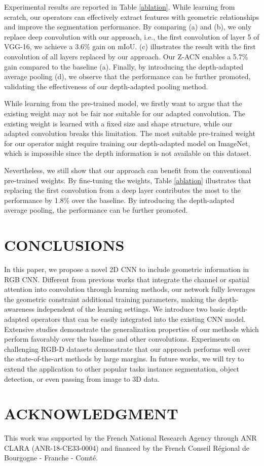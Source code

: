 \documentclass[lettersize,journal]{IEEEtran}
\begin{document}
Experimental results are reported in Table \ref{ablation}. While learning from scratch, our operators can effectively extract features with geometric relationships and improve the segmentation performance. By comparing (a) and (b), we only replace deep convolution with our approach, i.e., the first convolution of layer 5 of VGG-16, we achieve a 3.6\% gain on mIoU.  (c) illustrates the result with the first convolution of all layers replaced by our approach.  Our Z-ACN enables a 5.7\% gain compared to the baseline (a). Finally, by introducing the depth-adapted average pooling (d), we observe that the performance can be further promoted, validating the effectiveness of our depth-adapted pooling method.

While learning from the pre-trained model, we firstly want to argue that the existing weight may not be fair nor suitable for our adapted convolution. The existing weight is learned with a fixed size and shape structure, while our adapted convolution breaks this limitation. The most suitable pre-trained weight for our operator might require training our depth-adapted model on ImageNet, which is impossible since the depth information is not available on this dataset.

Nevertheless, we still show that our approach can benefit from the conventional pre-trained weights. By fine-tuning the weights, Table \ref{ablation} illustrates that replacing the first convolution from a deep layer contributes the most to the performance by 1.8\% over the baseline. By introducing the depth-adapted average pooling, the performance can be further promoted.


\section{CONCLUSIONS}

In this paper, we propose a novel 2D CNN to include geometric information in RGB CNN. Different from previous works that integrate the channel or spatial attention into convolution through learning methods, our network fully leverages the geometric constraint additional training parameters, making the depth-awareness independent of the learning settings. We introduce two basic depth-adapted operators that can be easily integrated into the existing CNN model. Extensive studies demonstrate the generalization properties of our methods which perform favorably over the baseline and other convolutions. Experiments on challenging RGB-D datasets demonstrate that our approach performs well over the state-of-the-art methods by large margins. In future works, we will try to extend the application to other popular tasks instance segmentation, object detection, or even passing from image to 3D data. 


\section*{ACKNOWLEDGMENT}
This work was supported by the French National Research Agency through ANR CLARA (ANR-18-CE33-0004) and financed by the French Conseil R\'egional de Bourgogne - Franche - Comt\'e.




\vfill
\end{document}
